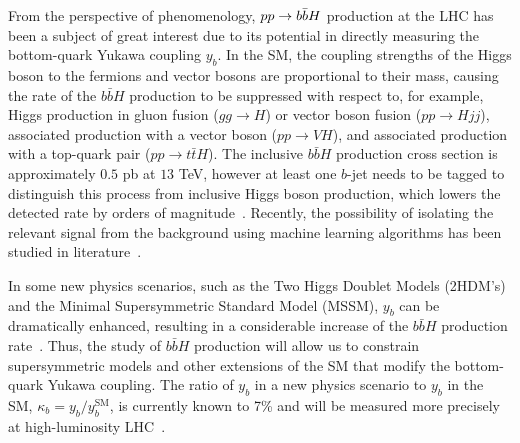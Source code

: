 \documentclass[main.tex]{subfiles}
\begin{document}
%

From the perspective of phenomenology, $pp \rightarrow b\bar{b}H$ production at the LHC has been a subject of great interest due to its potential in directly measuring the bottom-quark Yukawa coupling $y_b$. In the SM, the coupling strengths of the Higgs boson to the fermions and vector bosons are proportional to their mass, causing the rate of the $b\bar{b}H$ production to be suppressed with respect to, for example, Higgs production in gluon fusion ($gg\to H$) or vector boson fusion ($pp\to Hjj$), associated production with a vector boson ($pp\to VH$), and associated production with a top-quark pair ($pp\to t\bar{t}H$). The inclusive $b \bar{b} H$ production cross section is approximately $0.5$ pb at $13$ TeV, however at least one $b$-jet needs to be tagged to distinguish this process from inclusive Higgs boson production, which lowers the detected rate by orders of magnitude~\cite{Pagani:2020rsg}. Recently, the possibility of isolating the relevant signal from the background using machine learning algorithms has been studied in literature~\cite{Grojean:2020ech, Konar:2021nkk}.

In some new physics scenarios, such as the Two Higgs Doublet Models (2HDM's) and the Minimal Supersymmetric Standard Model (MSSM), $y_b$ can be dramatically enhanced, resulting in a considerable increase of the $b\bar{b}H$ production rate~\cite{Balazs:1998nt,Dawson:2005vi}. Thus, the study of $b\bar{b}H$ production will allow us to constrain supersymmetric models and other extensions of the SM that modify the bottom-quark Yukawa coupling. The ratio of $y_b$ in a new physics scenario to $y_b$ in the SM, $\kappa_b = y_b / y_b^{\text{SM}}$, is currently known to 7\% and will be measured more precisely at high-luminosity LHC~\cite{Cepeda:2019klc}.
\end{document}
